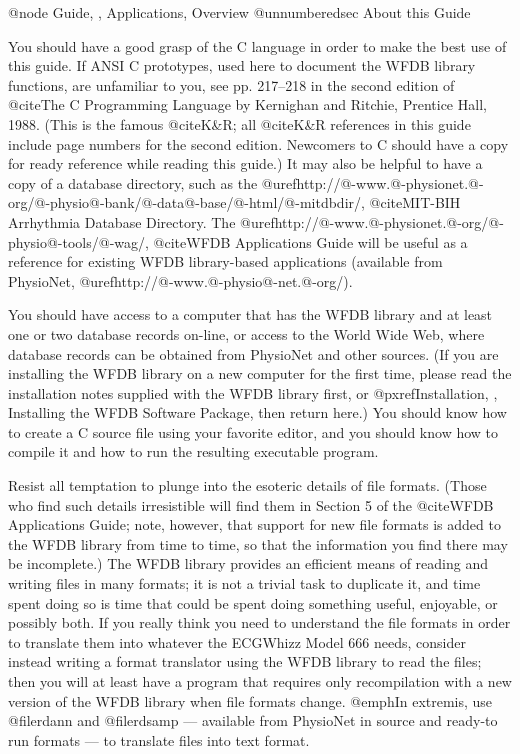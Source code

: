 @node     Guide, , Applications, Overview
@unnumberedsec About this Guide

You should have a good grasp of the C language in order to make the best
use of this guide.  If ANSI C prototypes, used here to document the WFDB
library functions, are unfamiliar to you, see pp. 217--218 in the second
edition of @cite{The C Programming Language} by Kernighan and Ritchie,
Prentice Hall, 1988.  (This is the famous @cite{K&R}; all @cite{K&R}
references in this guide include page numbers for the second edition.
Newcomers to C should have a copy for ready reference while reading this
guide.)  It may also be helpful to have a copy of a database directory,
such as the
@uref{http://@-www.@-physionet.@-org/@-physio@-bank/@-data@-base/@-html/@-mitdbdir/,
@cite{MIT-BIH Arrhythmia Database Directory}}.  The 
@uref{http://@-www.@-physionet.@-org/@-physio@-tools/@-wag/,
@cite{WFDB Applications Guide}} will be
useful as a reference for existing WFDB library-based applications
(available from PhysioNet, @uref{http://@-www.@-physio@-net.@-org/}).

You should have access to a computer that has the WFDB library and at
least one or two database records on-line, or access to the World Wide Web,
where database records can be obtained from PhysioNet and other sources.  (If
you are installing the WFDB library on a new computer for the first time,
please read the installation notes supplied with the WFDB library first, or
@pxref{Installation, , Installing the WFDB Software Package}, then return
here.)  You should know how to create a C source file using your
favorite editor, and you should know how to compile it and how to run
the resulting executable program.

Resist all temptation to plunge into the esoteric details of file
formats.  (Those who find such details irresistible will find them in
Section 5 of the @cite{WFDB Applications Guide}; note, however, that
support for new file formats is added to the WFDB library from time to
time, so that the information you find there may be incomplete.)  The
WFDB library provides an efficient means of reading and writing files in
many formats; it is not a trivial task to duplicate it, and time spent
doing so is time that could be spent doing something useful, enjoyable,
or possibly both.  If you really think you need to understand the file
formats in order to translate them into whatever the ECGWhizz Model 666
needs, consider instead writing a format translator using the WFDB
library to read the files; then you will at least have a program that
requires only recompilation with a new version of the WFDB library when
file formats change.  @emph{In extremis}, use @file{rdann} and
@file{rdsamp} --- available from PhysioNet in source and ready-to run
formats --- to translate files into text format.

